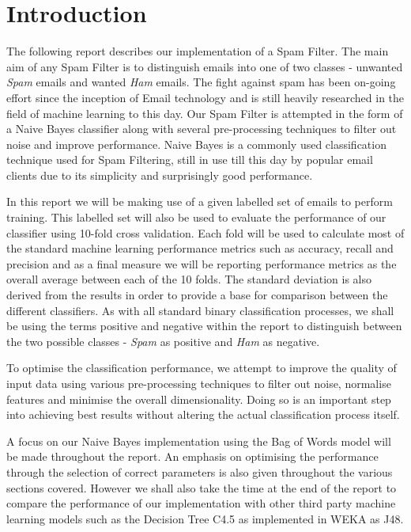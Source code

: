 \section{Introduction}
The following report describes our implementation of a Spam Filter. The main aim of any Spam Filter is to distinguish emails into one of two classes - unwanted \emph{Spam} emails and wanted \emph{Ham} emails. The fight against spam has been on-going effort since the inception of Email technology and is still heavily researched in the field of machine learning to this day. Our Spam Filter is attempted in the form of a Naive Bayes classifier along with several pre-processing techniques to filter out noise and improve performance. Naive Bayes is a commonly used classification technique used for Spam Filtering, still in use till this day by popular email clients due to its simplicity and surprisingly good performance.

In this report we will be making use of a given labelled set of emails to perform training. 
This labelled set will also be used to evaluate the performance of our classifier using 10-fold cross validation. 
Each fold will be used to calculate most of the standard machine learning performance metrics such as accuracy, recall and precision and as a final measure we will be reporting performance metrics as the overall average between each of the 10 folds. 
The standard deviation is also derived from the results in order to provide a base for comparison between the different classifiers.
As with all standard binary classification processes, we shall be using the terms positive and negative within the report to distinguish between the two possible classes - \emph{Spam} as positive and \emph{Ham} as negative.

To optimise the classification performance, we attempt to improve the quality of input data using various pre-processing techniques to filter out noise, normalise features and minimise the overall dimensionality. Doing so is an important step into achieving best results without altering the actual classification process itself.

A focus on our Naive Bayes implementation using the Bag of Words model will be made throughout the report.
An emphasis on optimising the performance through the selection of correct parameters is also given throughout the various sections covered.
However we shall also take the time at the end of the report to compare the performance of our implementation with other third party machine learning models such as the Decision Tree C4.5 as implemented in WEKA as J48.

